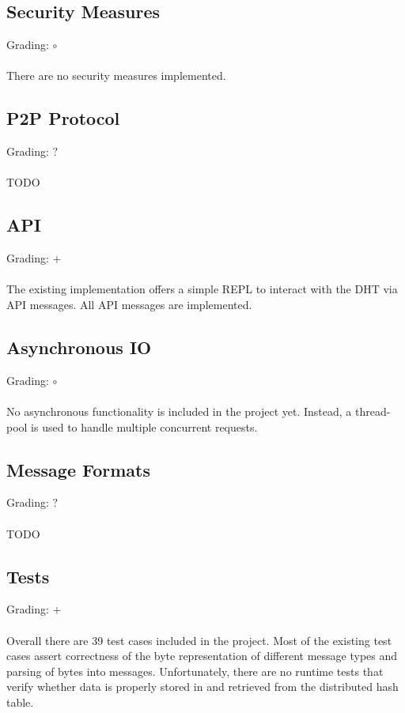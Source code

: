 \documentclass[a4paper, 11pt]{article}
\begin{document}
\subsection*{Security Measures}
Grading: $\circ$\\
\\
There are no security measures implemented.


\subsection*{P2P Protocol}
Grading: $?$\\
\\
TODO


\subsection*{API}
Grading: $+$\\
\\
The existing implementation offers a simple REPL to interact with the DHT via API messages.
All API messages are implemented.

\subsection*{Asynchronous IO}
Grading: $\circ$\\
\\
No asynchronous functionality is included in the project yet.
Instead, a thread-pool is used to handle multiple concurrent requests.


\subsection*{Message Formats}
Grading: $?$\\
\\
TODO


\subsection*{Tests}
Grading: $+$\\
\\
Overall there are 39 test cases included in the project.
Most of the existing test cases assert correctness of the byte representation of different message types and parsing of bytes into messages.
Unfortunately, there are no runtime tests that verify whether data is properly stored in and retrieved from the distributed hash table.
\end{document}
